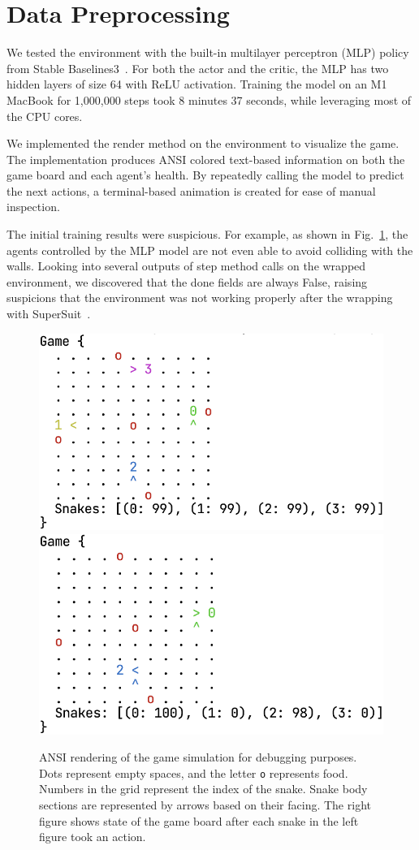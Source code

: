 \documentclass[a4paper]{article}
\begin{document}
\section{Data Preprocessing}

We tested the environment with the built-in multilayer perceptron (MLP)
policy from Stable Baselines3~\cite{raffin2024stable}.
For both the actor and the critic,
the MLP has two hidden layers of size 64 with ReLU activation.
Training the model on an M1 MacBook for 1,000,000 steps took 8 minutes 37
seconds, while leveraging most of the CPU cores.

We implemented the \textsf{render}
method on the environment to visualize the game.
The implementation produces ANSI colored text-based information on both the game
board and each agent's health.
By repeatedly calling the model to predict the next actions,
a terminal-based animation is created for ease of manual inspection.

The initial training results were suspicious. For example,
as shown in Fig.~\ref{fig:render},
the agents controlled by the MLP model are not even able to avoid colliding with
the walls. Looking into several outputs of \textsf{step}
method calls on the wrapped environment, we discovered that the \textsf{done}
fields are always \textsf{False},
raising suspicions that the environment was not working properly after the
wrapping with SuperSuit~\cite{SuperSuit}.

\begin{figure}
    \centering
    \includegraphics[width=0.4\linewidth]{game_render_eg.png}\quad
    \includegraphics[width=0.4\linewidth]{game_render_eg1.png}
    \caption{ANSI rendering of the game simulation for debugging purposes.
        Dots represent empty spaces, and the letter \texttt{o} represents food.
        Numbers in the grid represent the index of the snake.
        Snake body sections are represented by arrows based on their facing.
        The right figure shows state of the game board after each snake in the
        left figure took an action.
    }
    \label{fig:render}
\end{figure}
\end{document}
